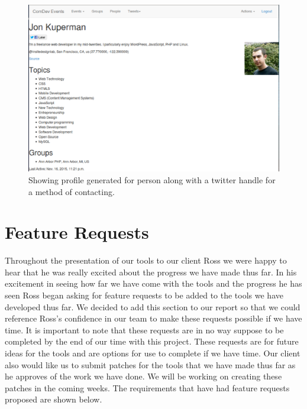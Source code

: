 \documentclass[draftclsnofoot,10pt,onecolumn]{IEEEtran} %
\begin{document}
\begin{enumerate}[label*=\arabic*.]
\end{enumerate}

\begin{figure}[H]
  \begin{center}
  
  \includegraphics[width=5in, frame]{peopleProfile}
  \captionsetup{width=.4\linewidth}
  \centering
  \caption{Showing profile generated for person along with a twitter handle for a method of contacting. }

  \end{center}
\end{figure}

\section{Feature Requests}
Throughout the presentation of our tools to our client Ross we were happy to hear that he was really excited about the progress we have made thus far.
In his excitement in seeing how far we have come with the tools and the progress he has seen
Ross began asking for feature requests to be added to the tools we have developed thus far.
We decided to add this section to our report so that we could reference Ross's confidence in our team to make these requests possible if we have time.
It is important to note that these requests are in no way suppose to be completed by the end of our time with this project.
These requests are for future ideas for the tools and are options for use to complete if we have time. Our client also would like us to submit patches for the tools
that we have made thus far as he approves of the work we have done. We will be working
on creating these patches in the coming weeks.
The requirements that have had feature requests proposed are shown below.
\end{document}
